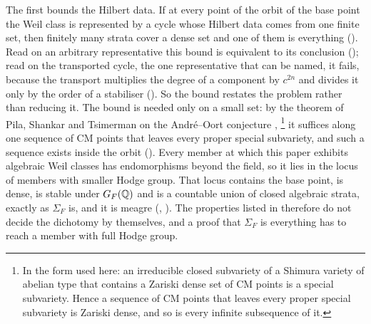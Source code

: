 The first bounds the Hilbert data. If at every point of the orbit of the
base point the Weil class is represented by a cycle whose Hilbert data comes
from one finite set, then finitely many strata cover a dense set and one of
them is everything (). Read on an arbitrary
representative this bound is equivalent to its conclusion
(); read on the transported cycle, the one
representative that can be named, it fails, because the transport multiplies
the degree of a component by $c^{2n}$ and divides it only by the order of a
stabiliser (). So the bound restates the problem rather
than reducing it.
The bound is needed only on a small set: by the theorem of Pila, Shankar
and Tsimerman on the Andr\'e--Oort conjecture \cite{PST},%
\footnote{In the form used here: an irreducible closed subvariety of a
Shimura variety of abelian type that contains a Zariski dense set of CM
points is a special subvariety. Hence a sequence of CM points that leaves
every proper special subvariety is Zariski dense, and so is every infinite
subsequence of it.}
it suffices along
one sequence of CM points that leaves every proper special subvariety, and
such a sequence exists inside the orbit (). Every
member at which this paper exhibits algebraic Weil classes has endomorphisms
beyond the field, so it lies in the locus of members with smaller Hodge
group. That locus contains the base point, is dense, is stable under
$G_{F}(\mathbb{Q})$ and is a countable union of closed algebraic strata, exactly as
$\Sigma_{F}$ is, and it is meagre (,
). The properties listed in  therefore
do not decide the dichotomy by themselves, and a proof that $\Sigma_{F}$ is
everything has to reach a member with full Hodge group.

